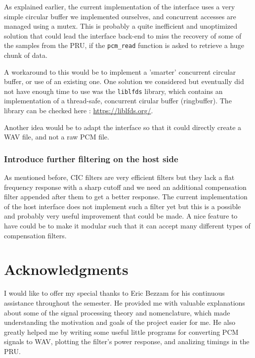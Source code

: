\documentclass[]{report}
\begin{document}
As explained earlier, the current implementation of the interface uses a very simple circular buffer we implemented ourselves, and concurrent accesses are managed using a mutex. This is probably a quite inefficient and unoptimized solution that could lead the interface back-end to miss the recovery of some of the samples from the PRU, if the \texttt{pcm\_read} function is asked to retrieve a huge chunk of data.

A workaround to this would be to implement a 'smarter' concurrent circular buffer, or use of an existing one. One solution we considered but eventually did not have enough time to use was the \texttt{liblfds} library, which contains an implementation of a thread-safe, concurrent cirular buffer (ringbuffer). The library can be checked here : 
\url{https://liblfds.org/}.

Another idea would be to adapt the interface so that it could directly create a WAV file, and not a raw PCM file.

\hypertarget{introduce-further-filtering-on-the-host-side}{%
\subsection{Introduce further filtering on the host
side}\label{introduce-further-filtering-on-the-host-side}}

As mentioned before, CIC filters are very efficient filters but they lack a flat frequency response with a sharp cutoff and we need an additional compensation filter appended after them to get a better response. The current implementation of the host interface does not implement such a filter yet but this is a possible and probably very useful improvement that could be made. A nice feature to have could be to make it modular such that it can accept many different types of compensation filters.

\hypertarget{acknowledgments}{%
\chapter{Acknowledgments}\label{acknowledgments}}

I would like to offer my special thanks to Eric Bezzam for his continuous assistance throughout the semester. He provided me with valuable explanations about some of the signal processing theory and nomenclature, which made understanding the motivation and goals of the project easier for me. He also greatly helped me by writing some useful little programs for converting PCM signals to WAV, plotting the filter's power response, and analizing timings in the PRU.
\end{document}

